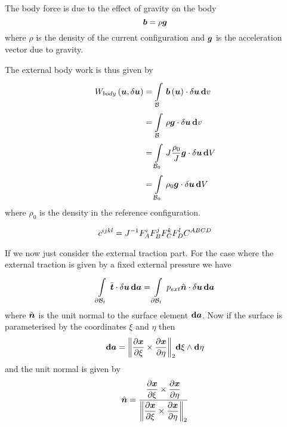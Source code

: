 The body force is due to the effect of gravity on the body \ie
\begin{equation}
  \boldsymbol{b}=\rho\boldsymbol{g}
\end{equation}
where $\rho$ is the density of the current configuration and $\boldsymbol{g}$ is
the acceleration vector due to gravity.

The external body work is thus given by
\begin{equation}
  \begin{split}
     W_{body}\left( \boldsymbol{u},\delta\boldsymbol{u} \right) 
    &=  \displaystyle\int\limits_{ \mathcal{B} }^{} \, \boldsymbol{b}\left( \boldsymbol{u} \right) \cdot\delta\boldsymbol{u}\, \boldsymbol{\mathrm{d}}  v \\
    &=  \displaystyle\int\limits_{ \mathcal{B} }^{} \,\rho\boldsymbol{g}\cdot\delta\boldsymbol{u}\, \boldsymbol{\mathrm{d}}  v \\
    &=  \displaystyle\int\limits_{ \mathcal{B} _{0}}^{} \,J\dfrac{\rho_{0}}{J}\boldsymbol{g}\cdot\delta\boldsymbol{u}\, \boldsymbol{\mathrm{d}}  V \\
    &=  \displaystyle\int\limits_{ \mathcal{B} _{0}}^{} \,\rho_{0}\boldsymbol{g}\cdot\delta\boldsymbol{u}\, \boldsymbol{\mathrm{d}}  V 
  \end{split}
\end{equation}
where $\rho_{0}$ is the density in the reference configuration.

\begin{equation}
  c^{ijkl}={J}^{-1}F^{i}_{A}F^{j}_{B}F^{k}_{C}F^{l}_{D}C^{ABCD}
\end{equation}


If we now just consider the external traction part. For the case where the
external traction is given by a fixed external pressure we have
\begin{equation}
    \displaystyle\int\limits_{ \partial{\ensuremath{ \mathcal{B} }} _{t}}^{} \,\bar{\boldsymbol{t}}\cdot\delta\boldsymbol{u}\, \boldsymbol{\mathrm{d}} \boldsymbol{a} =  \displaystyle\int\limits_{ \partial{\ensuremath{ \mathcal{B} }} _{t}}^{} \,p_{ext}\hat{\boldsymbol{n}}\cdot\delta\boldsymbol{u}\, \boldsymbol{\mathrm{d}} \boldsymbol{a} 
\end{equation}
where $\hat{\boldsymbol{n}}$ is the unit normal to the surface element
$  \boldsymbol{\mathrm{d}} \boldsymbol{a} $. Now if the surface is parameterised by the
coordinates $\xi$ and $\eta$ then
\begin{equation}
    \boldsymbol{\mathrm{d}} \boldsymbol{a} = {\left\|  \dfrac{\partial \boldsymbol{x}}{\partial \xi} \times \dfrac{\partial \boldsymbol{x}}{\partial \eta}  \right\|_{2}}    \boldsymbol{\mathrm{d}} \xi  \wedge   \boldsymbol{\mathrm{d}} \eta  
\end{equation}
and the unit normal is given by
\begin{equation}
  \hat{\boldsymbol{n}}=\dfrac{ \dfrac{\partial \boldsymbol{x}}{\partial \xi} \times \dfrac{\partial \boldsymbol{x}}{\partial \eta} }{ {\left\|  \dfrac{\partial \boldsymbol{x}}{\partial \xi} \times \dfrac{\partial \boldsymbol{x}}{\partial \eta}  \right\|_{2}} }
\end{equation}

